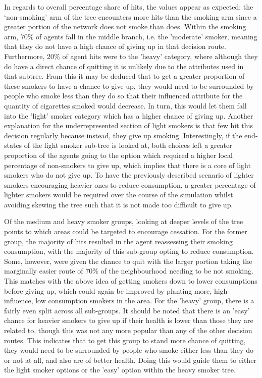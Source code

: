 \documentclass[]{report}
\begin{document}
In regards to overall percentage share of hits, the values appear as expected; the `non-smoking' arm of the tree encounters more hits than the smoking arm since a greater portion of the network does not smoke than does. Within the smoking arm, 70\% of agents fall in the middle branch, i.e. the 'moderate' smoker, meaning that they do not have a high chance of giving up in that decision route. Furthermore, 20\% of agent hits were to the 'heavy' category, where although they do have a direct chance of quitting it is unlikely due to the attributes used in that subtree. From this it may be deduced that to get a greater proportion of these smokers to have a chance to give up, they would need to be surrounded by people who smoke less than they do so that their influenced attribute for the quantity of cigarettes smoked would decrease. In turn, this would let them fall into the 'light' smoker category which has a higher chance of giving up. Another explanation for the underrepresented section of light smokers is that few hit this decision regularly because instead, they give up smoking. Interestingly, if the end-states of the light smoker sub-tree is looked at, both choices left a greater proportion of the agents going to the option which required a higher local percentage of non-smokers to give up, which implies that there is a core of light smokers who do not give up. To have the previously described scenario of lighter smokers encouraging heavier ones to reduce consumption, a greater percentage of lighter smokers would be required over the course of the simulation whilst avoiding skewing the tree such that it is not made too difficult to give up.

Of the medium and heavy smoker groups, looking at deeper levels of the tree points to which areas could be targeted to encourage cessation. For the former group, the majority of hits resulted in the agent reassessing their smoking consumption, with the majority of this sub-group opting to reduce consumption. Some, however, were given the chance to quit with the larger portion taking the marginally easier route of 70\% of the neighbourhood needing to be not smoking. This matches with the above idea of getting smokers down to lower consumptions before giving up, which could again be improved by planting more, high influence, low consumption smokers in the area. For the 'heavy' group, there is a fairly even split across all sub-groups. It should be noted that there is an 'easy' chance for heavier smokers to give up if their health is lower than those they are related to, though this was not any more popular than any of the other decision routes. This indicates that to get this group to stand more chance of quitting, they would need to be surrounded by people who smoke either less than they do or not at all, and also are of better health. Doing this would guide them to either the light smoker options or the 'easy' option within the heavy smoker tree.
\end{document}
